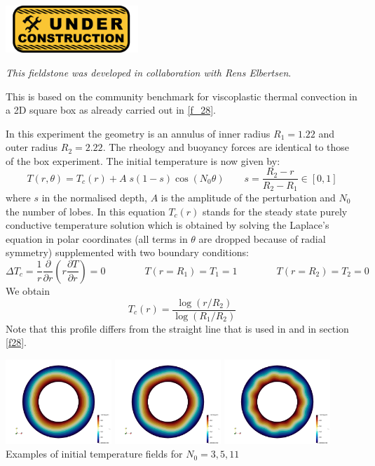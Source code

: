 
\includegraphics[width=5cm]{images/under_construction}

{\sl This fieldstone was developed in collaboration with Rens Elbertsen}. 

This is based on the community benchmark for viscoplastic thermal convection
in a 2D square box \cite{tosn15} as already carried out in \ref{f_28}.

In this experiment the geometry is an annulus of inner radius 
$R_1=1.22$ and outer radius $R_2=2.22$. 
The rheology and buoyancy forces are identical to those of the box 
experiment. The initial temperature is now given by:
\[
T(r,\theta) = T_c(r)+A\; s(1-s) \cos(N_0 \theta)
\quad\quad s=\frac{R_2-r}{R_2-R_1} \in [0,1]
\]
where $s$ in the normalised depth, $A$ is the amplitude of the perturbation and $N_0$ the 
number of lobes. In this equation $T_c(r)$ stands for the steady state purely conductive 
temperature solution which is obtained by solving the Laplace's equation in 
polar coordinates (all terms in $\theta$ are dropped because of radial symmetry) 
supplemented with two boundary conditions:
\[
\Delta T_c = \frac{1}{r}\frac{\partial }{\partial r} \left( r \frac{\partial T}{\partial r} \right) =0 
\quad\quad
\quad\quad
T(r=R_1)=T_1=1
\quad\quad
\quad\quad
T(r=R_2)=T_2=0
\]
We obtain 
\[
T_c(r)=\frac{\log (r/R_2)}{\log(R_1/R_2)}
\]
Note that this profile differs from the straight line that is used in \cite{tosn15} and in section \ref{f28}.

\begin{center}
\includegraphics[width=4cm]{python_codes/fieldstone_33/images/T_N03}
\includegraphics[width=4cm]{python_codes/fieldstone_33/images/T_N05}
\includegraphics[width=4cm]{python_codes/fieldstone_33/images/T_N11}\\
{\small Examples of initial temperature fields for $N_0=3,5,11$}
\end{center}

